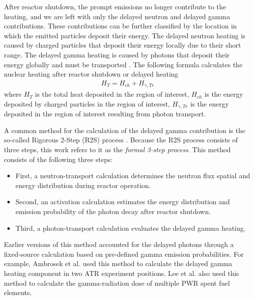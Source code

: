After reactor shutdown, the prompt emissions no longer contribute to the heating, and we are left with only the delayed neutron and delayed gamma contributions.
These contributions can be further classified by the location in which the emitted particles deposit their energy.
The delayed neutron heating is caused by charged particles that deposit their energy locally due to their short range.
The delayed gamma heating is caused by photons that deposit their energy globally and must be transported \cite{peterson-droogh_current_2018}.
The following formula calculates the nuclear heating after reactor shutdown or delayed heating
\begin{align}
H_{T} = H_{ch} + H_{\gamma, Tr} \label{eq:heat}
\end{align}
where $H_{T}$ is the total heat deposited in the region of interest, $H_{ch}$ is the energy deposited by charged particles in the region of interest, $H_{\gamma, Tr}$ is the energy deposited in the region of interest resulting from photon transport.

A common method for the calculation of the delayed gamma contribution is the so-called Rigorous 2-Step (R2S) process \cite{chen_rigorous_2002}.
Because the R2S process consists of three steps, this work refers to it as the \textit{formal 3-step process}.
This method consists of the following three steps:
\begin{itemize}
  \item First, a neutron-transport calculation determines the neutron flux spatial and energy distribution during reactor operation.
  \item Second, an activation calculation estimates the energy distribution and emission probability of the photon decay after reactor shutdown.
  \item Third, a photon-transport calculation evaluates the delayed gamma heating.
\end{itemize}

Earlier versions of this method accounted for the delayed photons through a fixed-source calculation based on pre-defined gamma emission probabilities.
For example, Ambrosek et al. \cite{ambrosek_improved_1995} used this method to calculate the delayed gamma heating component in two ATR experiment positions.
Lee et al. \cite{lee_tripoli_2013} also used this method to calculate the gamma-radiation dose of multiple \gls*{PWR} spent fuel elements.

